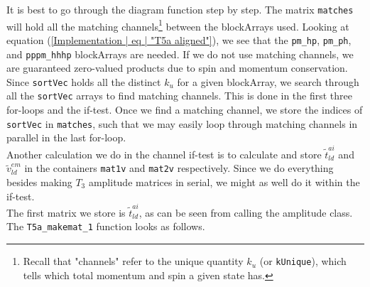 \documentclass[10pt,twoside]{report}
\begin{document}
	It is best to go through the diagram function step by step. The matrix \texttt{matches} will hold all the matching channels\footnote{Recall that "channels" refer to the unique quantity $k_u$ (or \texttt{kUnique}), which tells which total momentum and spin a given state has.} between the blockArrays used. Looking at equation (\ref{Implementation | eq | "T5a aligned"}), we see that the \texttt{pm\_hp}, \texttt{pm\_ph}, and \texttt{pppm\_hhhp} blockArrays are needed. If we do not use matching channels, we are guaranteed zero-valued products due to spin and momentum conservation. Since \texttt{sortVec} holds all the distinct $k_u$ for a given blockArray, we search through all the \texttt{sortVec} arrays to find matching channels. This is done in the first three for-loops and the if-test. Once we find a matching channel, we store the indices of \texttt{sortVec} in \texttt{matches}, such that we may easily loop through matching channels in parallel in the last for-loop.\\
	
	Another calculation we do in the channel if-test is to calculate and store $\tilde{t}_{ld}^{ai}$ and $\tilde{v}_{ld}^{em}$ in the containers \texttt{mat1v} and \texttt{mat2v} respectively. Since we do everything besides making $T_3$ amplitude matrices in serial, we might as well do it within the if-test.\\
	
	The first matrix we store is $\tilde{t}_{ld}^{ai}$, as can be seen from calling the amplitude class. The \texttt{T5a\_makemat\_1} function looks as follows.
	
\end{document}
